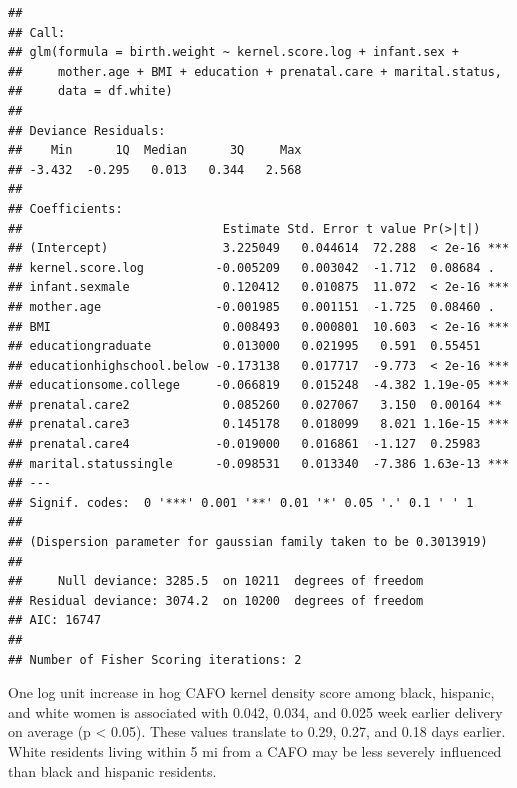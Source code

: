 \documentclass[
  12pt,
]{article}
\begin{document}
\begin{verbatim}
## 
## Call:
## glm(formula = birth.weight ~ kernel.score.log + infant.sex + 
##     mother.age + BMI + education + prenatal.care + marital.status, 
##     data = df.white)
## 
## Deviance Residuals: 
##    Min      1Q  Median      3Q     Max  
## -3.432  -0.295   0.013   0.344   2.568  
## 
## Coefficients:
##                            Estimate Std. Error t value Pr(>|t|)    
## (Intercept)                3.225049   0.044614  72.288  < 2e-16 ***
## kernel.score.log          -0.005209   0.003042  -1.712  0.08684 .  
## infant.sexmale             0.120412   0.010875  11.072  < 2e-16 ***
## mother.age                -0.001985   0.001151  -1.725  0.08460 .  
## BMI                        0.008493   0.000801  10.603  < 2e-16 ***
## educationgraduate          0.013000   0.021995   0.591  0.55451    
## educationhighschool.below -0.173138   0.017717  -9.773  < 2e-16 ***
## educationsome.college     -0.066819   0.015248  -4.382 1.19e-05 ***
## prenatal.care2             0.085260   0.027067   3.150  0.00164 ** 
## prenatal.care3             0.145178   0.018099   8.021 1.16e-15 ***
## prenatal.care4            -0.019000   0.016861  -1.127  0.25983    
## marital.statussingle      -0.098531   0.013340  -7.386 1.63e-13 ***
## ---
## Signif. codes:  0 '***' 0.001 '**' 0.01 '*' 0.05 '.' 0.1 ' ' 1
## 
## (Dispersion parameter for gaussian family taken to be 0.3013919)
## 
##     Null deviance: 3285.5  on 10211  degrees of freedom
## Residual deviance: 3074.2  on 10200  degrees of freedom
## AIC: 16747
## 
## Number of Fisher Scoring iterations: 2
\end{verbatim}

One log unit increase in hog CAFO kernel density score among black,
hispanic, and white women is associated with 0.042, 0.034, and 0.025
week earlier delivery on average (p \textless{} 0.05). These values
translate to 0.29, 0.27, and 0.18 days earlier. White residents living
within 5 mi from a CAFO may be less severely influenced than black and
hispanic residents.
\end{document}
